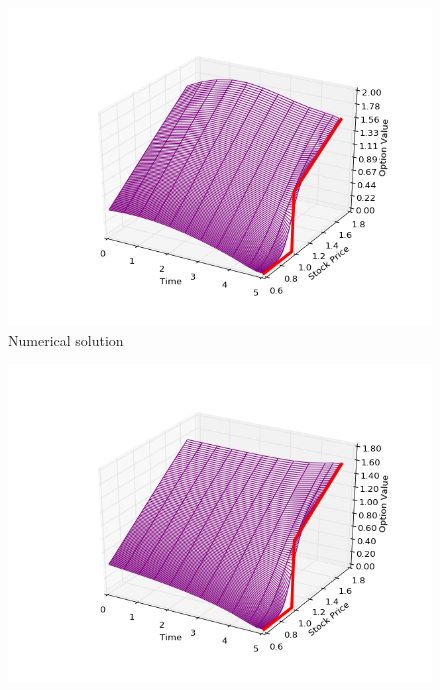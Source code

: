\documentclass[11pt,a4paper]{extarticle}
\begin{document}
\begin{minipage}{\linewidth}
      \centering
      \begin{minipage}{0.29\linewidth}
          \begin{figure}[H]
              \includegraphics[width=\linewidth]{Figures/a-o-n-call-num}
              \caption{Numerical solution}
          \end{figure}
      \end{minipage}
      \hspace{0.04\linewidth}
      \begin{minipage}{0.29\linewidth}
          \begin{figure}[H]
              \includegraphics[width=\linewidth]{Figures/a-o-n-call-analyt}

\end{figure}
\end{minipage}
\end{minipage}
\end{document}
